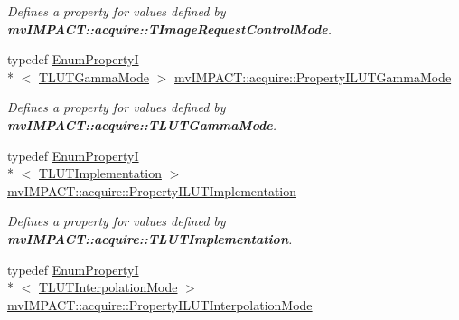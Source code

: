 \begin{DoxyCompactItemize}
\begin{DoxyCompactList}\small\item\em Defines a property for values defined by {\bfseries mv\+I\+M\+P\+A\+C\+T\+::acquire\+::\+T\+Image\+Request\+Control\+Mode}. \end{DoxyCompactList}\item 
\hypertarget{group___common_interface_gadd64b7cef36a40fd308cf7efe0209235}{typedef \hyperlink{classmv_i_m_p_a_c_t_1_1acquire_1_1_enum_property_i}{Enum\+Property\+I}\\*
$<$ \hyperlink{group___common_interface_gab9c7c29f6e598477f67fefe0b30addb0}{T\+L\+U\+T\+Gamma\+Mode} $>$ \hyperlink{group___common_interface_gadd64b7cef36a40fd308cf7efe0209235}{mv\+I\+M\+P\+A\+C\+T\+::acquire\+::\+Property\+I\+L\+U\+T\+Gamma\+Mode}}\label{group___common_interface_gadd64b7cef36a40fd308cf7efe0209235}

\begin{DoxyCompactList}\small\item\em Defines a property for values defined by {\bfseries mv\+I\+M\+P\+A\+C\+T\+::acquire\+::\+T\+L\+U\+T\+Gamma\+Mode}. \end{DoxyCompactList}\item 
\hypertarget{group___common_interface_ga1188a6c6d64010982c28d3bb7b60b2f7}{typedef \hyperlink{classmv_i_m_p_a_c_t_1_1acquire_1_1_enum_property_i}{Enum\+Property\+I}\\*
$<$ \hyperlink{group___common_interface_ga7ba807ea2d27f199703d303b0901e243}{T\+L\+U\+T\+Implementation} $>$ \hyperlink{group___common_interface_ga1188a6c6d64010982c28d3bb7b60b2f7}{mv\+I\+M\+P\+A\+C\+T\+::acquire\+::\+Property\+I\+L\+U\+T\+Implementation}}\label{group___common_interface_ga1188a6c6d64010982c28d3bb7b60b2f7}

\begin{DoxyCompactList}\small\item\em Defines a property for values defined by {\bfseries mv\+I\+M\+P\+A\+C\+T\+::acquire\+::\+T\+L\+U\+T\+Implementation}. \end{DoxyCompactList}\item 
\hypertarget{group___common_interface_ga2b9fd1a0f1dcf0867c527f11a1a1da65}{typedef \hyperlink{classmv_i_m_p_a_c_t_1_1acquire_1_1_enum_property_i}{Enum\+Property\+I}\\*
$<$ \hyperlink{group___common_interface_ga40d5450344b3aaaf127544ef3985cfbb}{T\+L\+U\+T\+Interpolation\+Mode} $>$ \hyperlink{group___common_interface_ga2b9fd1a0f1dcf0867c527f11a1a1da65}{mv\+I\+M\+P\+A\+C\+T\+::acquire\+::\+Property\+I\+L\+U\+T\+Interpolation\+Mode}}\label{group___common_interface_ga2b9fd1a0f1dcf0867c527f11a1a1da65}


\end{DoxyCompactItemize}
